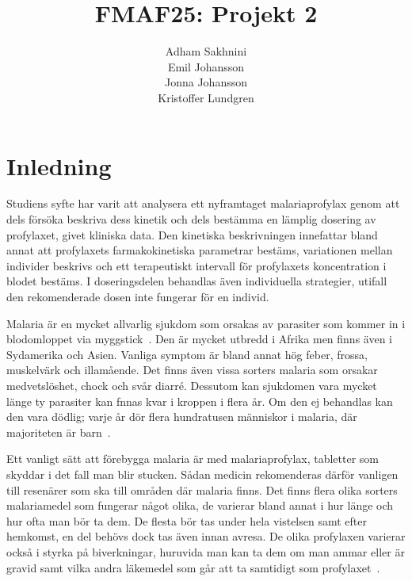 \documentclass[a4paper,11pt]{article}
\title{FMAF25: Projekt 2}
\author{Adham Sakhnini \\ Emil Johansson \\ Jonna Johansson \\ Kristoffer Lundgren}
\begin{document}
\maketitle


\section{Inledning}

Studiens syfte har varit att analysera ett nyframtaget malariaprofylax genom att dels försöka beskriva dess kinetik och dels bestämma en lämplig dosering av profylaxet, givet kliniska data. Den kinetiska beskrivningen innefattar bland annat att profylaxets farmakokinetiska parametrar bestäms, variationen mellan individer beskrivs och ett terapeutiskt intervall för profylaxets koncentration i blodet bestäms. I doseringsdelen behandlas även individuella strategier, utifall den rekomenderade dosen inte fungerar för en individ.

Malaria är en mycket allvarlig sjukdom som orsakas av parasiter som kommer in i blodomloppet via myggstick~\cite{ann}. Den är mycket utbredd i Afrika men finns även i Sydamerika och Asien. Vanliga symptom är bland annat  hög feber, frossa, muskelvärk och illamående. Det finns även vissa sorters malaria som orsakar medvetslöshet, chock och svår diarré. Dessutom kan sjukdomen vara mycket länge ty parasiter kan fnnas kvar i kroppen i flera år. Om den ej behandlas kan den vara dödlig; varje år dör flera hundratusen människor i malaria, där majoriteten är barn~\cite{lennart}.

Ett vanligt sätt  att förebygga malaria är med malariaprofylax, tabletter som skyddar i det fall man blir stucken. Sådan medicin rekomenderas därför vanligen till resenärer som ska till områden där malaria finns. Det finns flera olika sorters malariamedel som fungerar något olika, de varierar bland annat i hur länge och hur ofta man bör ta dem. De flesta bör tas under hela vistelsen samt efter hemkomst, en del behövs dock tas även innan avresa. De olika profylaxen varierar också i styrka på biverkningar, huruvida man kan ta dem om man ammar eller är gravid samt vilka andra läkemedel som går att ta samtidigt som profylaxet~\cite{malariaab}.

\end{document}
